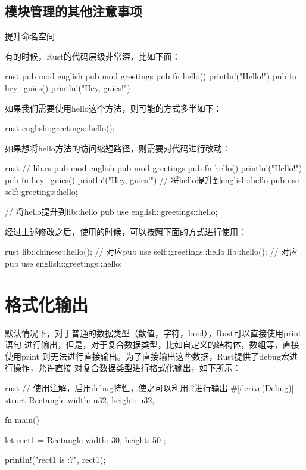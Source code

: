 \subsection{模块管理的其他注意事项}

\begin{outline}[enumerate]
\1 提升命名空间

有的时候，Rust的代码层级非常深，比如下面：
\begin{code-in-enumerate}{rust}
pub mod english {
    pub mod greetings {
        pub fn hello() {
            println!("Hello!")
        }
        pub fn hey_guies() {
            println!("Hey, guies!")
        }
    }
}
\end{code-in-enumerate}
如果我们需要使用hello这个方法，则可能的方式多半如下：
\begin{code-in-enumerate}{rust}
english::greetings::hello();
\end{code-in-enumerate}
如果想将hello方法的访问缩短路径，则需要对代码进行改动：
\begin{code-in-enumerate}{rust}
// lib.rs
pub mod english {
    pub mod greetings {
        pub fn hello() {
            println!("Hello!")
        }
        pub fn hey_guies() {
            println!("Hey, guies!")
        }
    }
    // 将hello提升到english::hello
    pub use self::greetings::hello;
}

// 将hello提升到lib::hello
pub use english::greetings::hello;
\end{code-in-enumerate}
经过上述修改之后，使用的时候，可以按照下面的方式进行使用：
\begin{code-in-enumerate}{rust}
lib::chinese::hello(); // 对应pub use self::greetings::hello
lib::hello(); // 对应 pub use english::greetings::hello;
\end{code-in-enumerate}

\end{outline}

\section{格式化输出}
默认情况下，对于普通的数据类型（数值，字符，bool），Rust可以直接使用print语句
进行输出，但是，对于复合数据类型，比如自定义的结构体，数组等，直接使用print
则无法进行直接输出。为了直接输出这些数据，Rust提供了debug宏进行操作，允许直接
对复合数据类型进行格式化输出，如下所示：
\begin{code-block}{rust}
// 使用注解，启用debug特性，使之可以利用:?进行输出
#[derive(Debug)]
struct Rectangle {
    width: u32,
    height: u32,
}

fn main() {
    let rect1 = Rectangle { width: 30, height: 50 };

    println!("rect1 is {:?}", rect1);
}
\end{code-block}

